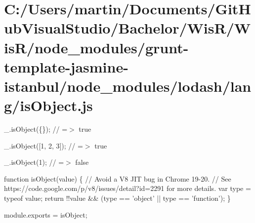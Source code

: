 \hypertarget{_c_1_2_users_2martin_2_documents_2_git_hub_visual_studio_2_bachelor_2_wis_r_2_wis_r_2node_modulef50e8c9dbbbf134d953acdb389d5154a}{}\section{C\+:/\+Users/martin/\+Documents/\+Git\+Hub\+Visual\+Studio/\+Bachelor/\+Wis\+R/\+Wis\+R/node\+\_\+modules/grunt-\/template-\/jasmine-\/istanbul/node\+\_\+modules/lodash/lang/is\+Object.\+js}
\+\_\+.\+is\+Object(\{\}); // =$>$ true

\+\_\+.\+is\+Object(\mbox{[}1, 2, 3\mbox{]}); // =$>$ true

\+\_\+.\+is\+Object(1); // =$>$ false


\begin{DoxyCodeInclude}

\textcolor{keyword}{function} isObject(value) \{
  \textcolor{comment}{// Avoid a V8 JIT bug in Chrome 19-20.}
  \textcolor{comment}{// See https://code.google.com/p/v8/issues/detail?id=2291 for more details.}
  var type = typeof value;
  \textcolor{keywordflow}{return} !!value && (type == \textcolor{stringliteral}{'object'} || type == \textcolor{stringliteral}{'function'});
\}

module.exports = isObject;
\end{DoxyCodeInclude}
 